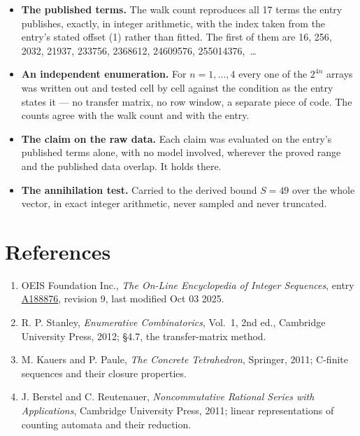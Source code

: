 \documentclass[11pt]{article}
\theoremstyle{definition}
\begin{document}
\begin{itemize}

\item {\bfseries The published terms.} The walk count reproduces all 17 terms the entry publishes, exactly, in integer arithmetic, with the index taken from the entry's stated offset (1) rather than fitted. The first of them are 16, 256, 2032, 21937, 233756, 2368612, 24609576, 255014376,~\dots

\item {\bfseries An independent enumeration.} For $n = 1,\dots,4$ every one of the $2^{4n}$ arrays was written out and tested cell by cell against the condition as the entry states it --- no transfer matrix, no row window, a separate piece of code. The counts agree with the walk count and with the entry.

\item {\bfseries The claim on the raw data.} Each claim was evaluated on the entry's published terms alone, with no model involved, wherever the proved range and the published data overlap. It holds there.

\item {\bfseries The annihilation test.} Carried to the derived bound $S = 49$ over the whole vector, in exact integer arithmetic, never sampled and never truncated.

\end{itemize}

\section{References}

\begin{enumerate}

\item OEIS Foundation Inc., \emph{The On-Line Encyclopedia of Integer Sequences}, entry \href{https://oeis.org/A188876}{A188876}, revision 9, last modified Oct 03 2025.

\item R. P. Stanley, \emph{Enumerative Combinatorics}, Vol.~1, 2nd ed., Cambridge University Press, 2012; \S4.7, the transfer-matrix method.

\item M. Kauers and P. Paule, \emph{The Concrete Tetrahedron}, Springer, 2011; C-finite sequences and their closure properties.

\item J. Berstel and C. Reutenauer, \emph{Noncommutative Rational Series with Applications}, Cambridge University Press, 2011; linear representations of counting automata and their reduction.

\end{enumerate}
\end{document}
